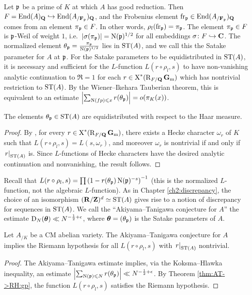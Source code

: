 Let $\mathfrak{p}$ be a prime of $K$ at which $A$ has good reduction. Then 
$F = \operatorname{End}(A)_{\mathbf{Q}}\hookrightarrow \operatorname{End}(A_{/\mathbf{F}_{\mathfrak{p}}})_{\mathbf{Q}}$, and the Frobenius 
element $\mathrm{fr}_{\mathfrak{p}}\in \operatorname{End}(A_{/\mathbf{F}_{\mathfrak{p}}})_{\mathbf{Q}}$ comes from an element 
$\pi_{\mathfrak{p}}\in F$. In other words, $\rho_l(\mathrm{fr}_{\mathfrak{p}}) = \pi_{\mathfrak{p}}$. The element 
$\pi_{\mathfrak{p}}\in F$ is $\mathfrak{p}$-Weil of weight $1$, 
i.e.~$|\sigma(\pi_{\mathfrak{p}})| = \operatorname{N}(\mathfrak{p})^{1/2}$ for all embeddings 
$\sigma\colon F\hookrightarrow \mathbf{C}$. The normalized element 
$\theta_{\mathfrak{p}} = \frac{\pi_{\mathfrak{p}}}{\operatorname{N}(\mathfrak{p})^{1/2}}$ lies in $\mathrm{ST}(A)$, and we call this 
the Satake parameter for $A$ at $\mathfrak{p}$. For the Satake parameters to be 
equidistributed in $\mathrm{ST}(A)$, it is necessary and sufficient for the 
$L$-function $L(r\circ \rho_l,s)$ to have non-vanishing analytic continuation 
to $\Re =1$ for each $r\in \operatorname{X}^\ast(\operatorname{R}_{F/\mathbf{Q}}\mathbf{G}_\mathrm{m})$ which has nontrivial 
restriction to $\mathrm{ST}(A)$. By the Wiener--Ikehara Tauberian theorem, this is 
equivalent to an estimate 
$\left| \sum_{\operatorname{N}(fp)\leqslant x} r(\theta_{\mathfrak{p}})\right| = o(\pi_K(x))$. 

\begin{theorem}
The elements $\theta_{\mathfrak{p}}\in \mathrm{ST}(A)$ are equidistributed with respect to the 
Haar measure. 
\end{theorem}
\begin{proof}
By \cite[Th.~10, 11]{serre-tate-1968}, for every 
$r\in \operatorname{X}^\ast(\operatorname{R}_{F/\mathbf{Q}}\mathbf{G}_\mathrm{m})$, there exists a Hecke character $\omega_r$ of $K$ 
such that $L(r\circ \rho_l,s) = L(s,\omega_r)$, and moreover $\omega_r$ is 
nontrivial if and only if $\left.r\right|_{\mathrm{ST}(A)}$ is. Since $L$-functions of 
Hecke characters have the desired analytic continuation and nonvanishing, the 
result follows. 
\end{proof}

Recall that 
$L(r\circ \rho_l,s) = \prod \left(1 - r(\theta_{\mathfrak{p}}) \operatorname{N}(\mathfrak{p})^{-s}\right)^{-1}$ 
(this is the normalized $L$-function, not the algebraic $L$-function). 
As in Chapter \ref{ch2:discrepancy}, the choice of an isomorphism
$(\mathbf{R}/\mathbf{Z})^d\simeq \mathrm{ST}(A)$ gives rise to a notion of discrepancy 
for sequences in $\mathrm{ST}(A)$. We call the ``Akiyama--Tanigawa conjecture for $A$'' 
the estimate $\operatorname{D}_N({\boldsymbol\theta}) \ll N^{-\frac 1 2+\epsilon}$, where 
${\boldsymbol\theta} = (\theta_{\mathfrak{p}})$ is the Satake parameters of $A$. 

\begin{theorem}\label{AT->RH:AB}
Let $A_{/K}$ be a CM abelian variety. The Akiyama--Tanigawa conjecture for $A$ 
implies the Riemann hypothesis for all $L(r\circ \rho_l,s)$ with 
$\left. r\right|_{\mathrm{ST}(A)}$ nontrivial. 
\end{theorem}
\begin{proof}
The Akiyama--Tanigawa estimate implies, via the Koksma--Hlawka inequality, an 
estimate 
$\left| \sum_{\operatorname{N}(\mathfrak{p})\leqslant N} r(\theta_{\mathfrak{p}})\right| \ll N^{-\frac 1 2+\epsilon}$. 
By Theorem \ref{thm:AT->RH:gp}, the function $L(r\circ \rho_l,s)$ satisfies 
the Riemann hypothesis. 
\end{proof}

